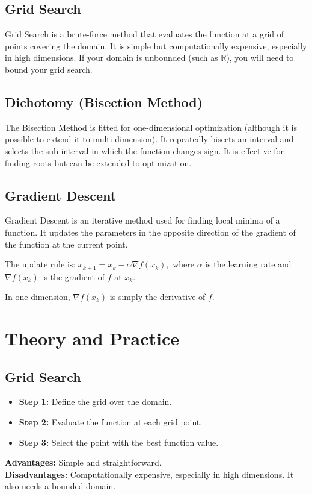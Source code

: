 \documentclass[]{article}
\newcommand{\R}{\mathbb{R}}
\begin{document}
	\subsection*{Grid Search}
	Grid Search is a brute-force method that evaluates the function at a grid of points covering the domain.
	It is simple but computationally expensive, especially in high dimensions.
	If your domain is unbounded (such as $\R$), you will need to bound your grid search.
	
	\subsection*{Dichotomy (Bisection Method)}
	The Bisection Method is fitted for one-dimensional optimization (although it is possible to extend it to multi-dimension).
	It repeatedly bisects an interval and selects the sub-interval in which the function changes sign.
	It is effective for finding roots but can be extended to optimization.
	
	\subsection*{Gradient Descent}
	Gradient Descent is an iterative method used for finding local minima of a function.
	It updates the parameters in the opposite direction of the gradient of the function at the current point. 
	
	The update rule is:
	$x_{k+1} = x_k - \alpha \nabla f(x_k),$
	where $\alpha$ is the learning rate and $\nabla f(x_k)$ is the gradient of $f$ at $x_k$.
	
	In one dimension, $\nabla f(x_k)$ is simply the derivative of $f$.
	
	\section*{Theory and Practice}
	\subsection*{Grid Search}
	\begin{itemize}
		\item \textbf{Step 1:} Define the grid over the domain.
		\item \textbf{Step 2:} Evaluate the function at each grid point.
		\item \textbf{Step 3:} Select the point with the best function value.
	\end{itemize}
	\textbf{Advantages:} Simple and straightforward.
	\\
	\textbf{Disadvantages:} Computationally expensive, especially in high dimensions.
	It also needs a bounded domain.
	
\end{document}
